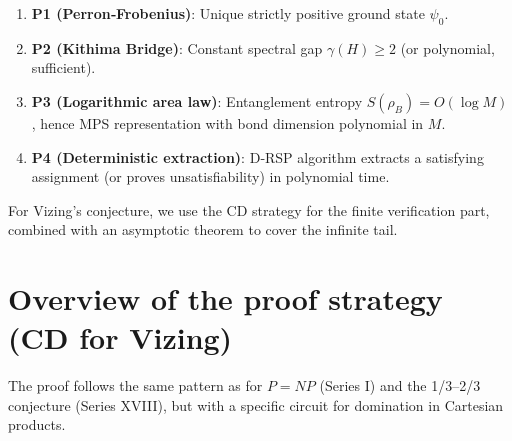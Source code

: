 \documentclass[11pt,a4paper]{article}
\begin{document}
\begin{enumerate}
\item \textbf{P1 (Perron‑Frobenius)}: Unique strictly positive ground state $\psi_0$.
\item \textbf{P2 (Kithima Bridge)}: Constant spectral gap $\gamma(H) \ge 2$ (or polynomial, sufficient).
\item \textbf{P3 (Logarithmic area law)}: Entanglement entropy $S(\rho_B)=O(\log M)$, hence MPS representation with bond dimension polynomial in $M$.
\item \textbf{P4 (Deterministic extraction)}: D‑RSP algorithm extracts a satisfying assignment (or proves unsatisfiability) in polynomial time.
\end{enumerate}

For Vizing's conjecture, we use the CD strategy for the finite verification part, combined with an asymptotic theorem to cover the infinite tail.

\section{Overview of the proof strategy (CD for Vizing)}

The proof follows the same pattern as for $P=NP$ (Series I) and the 1/3–2/3 conjecture (Series XVIII), but with a specific circuit for domination in Cartesian products.
\end{document}
